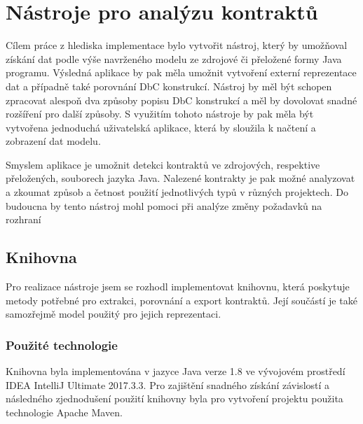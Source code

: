 \chapter{Nástroje pro analýzu kontraktů}
	Cílem práce z hlediska implementace bylo vytvořit nástroj, který by umožňoval získání dat podle výše navrženého modelu ze zdrojové či přeložené formy Java programu. Výsledná aplikace by pak měla umožnit vytvoření externí reprezentace dat a případně také porovnání DbC konstrukcí. Nástroj by měl být schopen zpracovat alespoň dva způsoby popisu DbC konstrukcí a měl by dovolovat snadné rozšíření pro další způsoby. S využitím tohoto nástroje by pak měla být vytvořena jednoduchá uživatelská aplikace, která by sloužila k načtení a zobrazení dat modelu.
	
	Smyslem aplikace je umožnit detekci kontraktů ve zdrojových, respektive přeložených, souborech jazyka Java. Nalezené kontrakty je pak možné analyzovat a zkoumat způsob a četnost použití jednotlivých typů v různých projektech. Do budoucna by tento nástroj mohl pomoci při analýze změny požadavků na rozhraní 
	
	
	
	\section{Knihovna}
		Pro realizace nástroje jsem se rozhodl implementovat knihovnu, která poskytuje metody potřebné pro extrakci, porovnání a export kontraktů. Její součástí je také samozřejmě model použitý pro jejich reprezentaci. 

	    \subsection{Použité technologie}
			Knihovna byla implementována v jazyce Java verze 1.8 ve vývojovém prostředí IDEA IntelliJ Ultimate 2017.3.3. Pro zajištění snadného získání závislostí a následného zjednodušení použití knihovny byla pro vytvoření projektu použita technologie Apache Maven.


